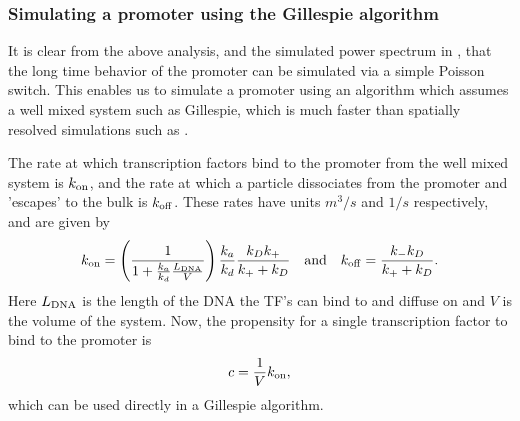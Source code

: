 \subsubsection{Simulating a promoter using the Gillespie algorithm}
It is clear from the above analysis, and the simulated power spectrum in , that the long time behavior of the promoter can be simulated via a simple Poisson switch. This enables us to simulate a promoter using an algorithm which assumes a well mixed system such as Gillespie, which is much faster than spatially resolved simulations such as \GFRD.

The rate at which transcription factors bind to the promoter from the well mixed system is $k_{\rm on}$, and the rate at which a particle dissociates from the promoter and 'escapes' to the bulk is $k_{\rm off}$. These rates have units $m^3/s$ and $1/s$ respectively, and are given by
\begin{equation}
 k_{\rm on} = \left( \frac{1}{1 + \frac{k_a}{k_d} \frac{L_{\rm DNA}}{V}} \right) \frac{k_a}{k_d} \frac{k_D k_+}{k_+ + k_D} \quad {\rm and} \quad k_{\rm off} = \frac{k_- k_D}{k_+ + k_D}.
\end{equation}
Here $L_{\rm DNA}$ is the length of the DNA the TF's can bind to and diffuse on and $V$ is the volume of the system. Now, the propensity for a single transcription factor to bind to the promoter is
\begin{equation}
 c = \frac{1}{V} k_{\rm on},
\end{equation}
which can be used directly in a Gillespie algorithm.



